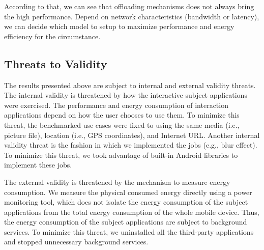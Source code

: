 \documentclass{sig-alternate}
\begin{document}
According to that, we can see that offloading mechanisms does not always bring the high performance. Depend on network characteristics (bandwidth or latency), we can decide which model to setup to maximize performance and energy efficiency for the circumstance.

\subsection{Threats to Validity}
The results presented above are subject to internal and external validity threats. The internal validity is threatened by how the interactive subject applications were exercised. The performance and energy consumption of interaction applications depend on how the user chooses to use them. To minimize this threat, the benchmarked use cases were fixed to using the same media (i.e., picture file), location (i.e., GPS coordinates), and Internet URL. Another internal validity threat is the fashion in which we implemented the jobs (e.g., blur effect). To minimize this threat, we took advantage of built-in Android libraries to implement these jobs.

The external validity is threatened by the mechanism to measure energy consumption. We measure the physical consumed energy directly using a power monitoring tool, which does not isolate the energy consumption of the subject applications from the total energy consumption of the whole mobile device. Thus, the energy consumption of the subject applications are subject to background services. To minimize this threat, we uninstalled all the third-party applications and stopped unnecessary background services.


\end{document}
